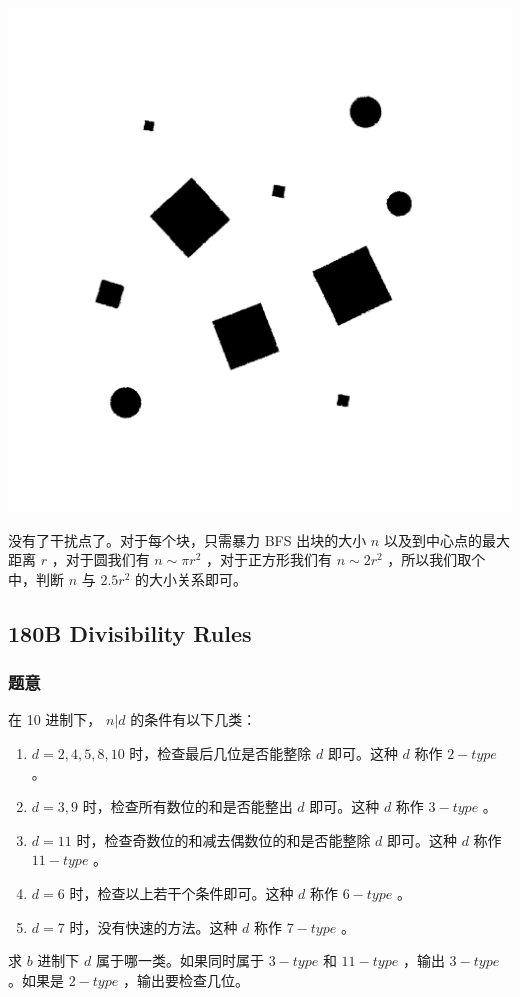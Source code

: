 \documentclass[11pt]{article}
\begin{document}
\begin{center}\includegraphics[scale = 0.2]{pic/178E3-hard-2-show.png}\end{center}

    没有了干扰点了。对于每个块，只需暴力 BFS 出块的大小 $n$ 以及到中心点的最大距离 $r$ ，对于圆我们有 $n \sim \pi r^2$ ，对于正方形我们有 $n \sim 2 r^2$ ，所以我们取个中，判断 $n$ 与 $2.5 r^2$ 的大小关系即可。
\subsection{180B  Divisibility Rules}
\label{sec-10-7}
\subsubsection{题意}
\label{sec-10-7-1}

    在 10 进制下， $n \vert d$ 的条件有以下几类：
\begin{enumerate}
\item $d = 2, 4, 5, 8, 10$ 时，检查最后几位是否能整除 $d$ 即可。这种 $d$ 称作 $2-type$ 。
\item $d = 3, 9$ 时，检查所有数位的和是否能整出 $d$ 即可。这种 $d$ 称作 $3-type$ 。
\item $d = 11$ 时，检查奇数位的和减去偶数位的和是否能整除 $d$ 即可。这种 $d$ 称作 $11-type$ 。
\item $d = 6$ 时，检查以上若干个条件即可。这种 $d$ 称作 $6-type$ 。
\item $d = 7$ 时，没有快速的方法。这种 $d$ 称作 $7-type$ 。
\end{enumerate}
    求 $b$ 进制下 $d$ 属于哪一类。如果同时属于 $3-type$ 和 $11-type$ ，输出 $3-type$ 。如果是 $2-type$ ，输出要检查几位。
\end{document}
